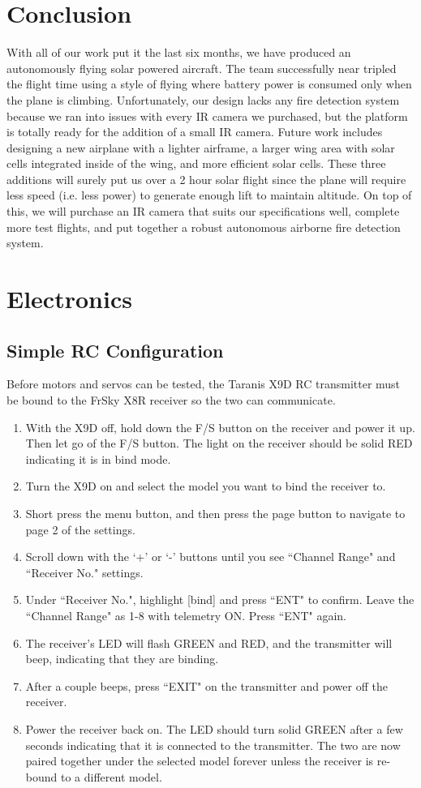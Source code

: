 \documentclass[12pt,journal,compsoc]{IEEEtran}
\begin{document}
\section{Conclusion}
With all of our work put it the last six months, we have produced an autonomously flying solar powered aircraft. The team successfully near tripled the flight time using a style of flying where battery power is consumed only when the plane is climbing. Unfortunately, our design lacks any fire detection system because we ran into issues with every IR camera we purchased, but the platform is totally ready for the addition of a small IR camera. Future work includes designing a new airplane with a lighter airframe, a larger wing area with solar cells integrated inside of the wing, and more efficient solar cells. These three additions will surely put us over a 2 hour solar flight since the plane will require less speed (i.e. less power) to generate enough lift to maintain altitude. On top of this, we will purchase an IR camera that suits our specifications well, complete more test flights, and put together a robust autonomous airborne fire detection system.

%
%

\appendices
\section{Electronics}
\label{electronics}
\subsection{Simple RC Configuration}
Before motors and servos can be tested, the Taranis X9D RC transmitter must be bound to the FrSky X8R receiver so the two can communicate.
\begin{enumerate}
\item With the X9D off, hold down the F/S button on the receiver and power it up. Then let go of the F/S button. The light on the receiver should be solid RED indicating it is in bind mode.
\item Turn the X9D on and select the model you want to bind the receiver to.
\item Short press the menu button, and then press the page button to navigate to page 2 of the settings.
\item Scroll down with the `+' or `-' buttons until you see ``Channel Range" and ``Receiver No." settings.
\item Under ``Receiver No.", highlight [bind] and press ``ENT" to confirm. Leave the ``Channel Range" as 1-8 with telemetry ON. Press ``ENT" again.
\item The receiver's LED will flash GREEN and RED, and the transmitter will beep, indicating that they are binding.
\item After a couple beeps, press ``EXIT" on the transmitter and power off the receiver.
\item Power the receiver back on. The LED should turn solid GREEN after a few seconds indicating that it is connected to the transmitter. The two are now paired together under the selected model forever unless the receiver is re-bound to a different model.
\end{enumerate}
\end{document}
